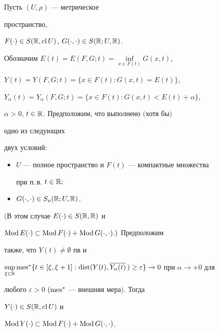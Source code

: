 \begin{thm} Пусть $(U,\rho)$ --- метрическое


пространство,


$F(\cdot)\in S(\Bbb R,\operatorname{cl} U)$, $G(\cdot,\cdot)\in S(\Bbb R;U,\Bbb R)$.


Обозначим $E(t)=E(F,G;t)=\inf\limits_{x\in F(t)}G(x,t)$,


$Y(t)=Y(F,G;t)=\{x\in F(t):G(x,t)=E(t)\}$,


$Y_\alpha(t)=Y_\alpha(F,G;t)=\{x\in F(t):G(x,t)<E(t)+\alpha\}$,


$\alpha>0$, $t\in\Bbb R$. Предположим, что выполнено $($хотя бы$)$


одно из следующих


двух условий$:$


\begin{itemize}


\item[1)] $U$ --- полное пространство и $F(t)$ --- компактные множества


при п.\,в. $t\in\Bbb R;$


\item[2)] $G(\cdot,\cdot)\in S_u(\Bbb R;U,\Bbb R)$.


\end{itemize}


$($В этом случае $E(\cdot)\in S(\Bbb R,\Bbb R)$ и


$\operatorname{Mod} E(\cdot)\subset\operatorname{Mod} F(\cdot)+\operatorname{Mod} G(\cdot,\cdot).)$ Предположим


также, что $Y(t)\ne\emptyset$ пв и


$\sup\limits_{\xi\in\Bbb R}\mes^*\{t\in[\xi,\xi+1]:\dist(Y(t),


\overline{Y_\alpha(t)}\,)\ge\varepsilon\}\to 0$ при $\alpha\to+0$ для


любого $\varepsilon>0$ $(\operatorname{mes}^*$ --- внешняя мера$).$ Тогда


$Y(\cdot)\in S(\Bbb R,\operatorname{cl} U)$ и


$\operatorname{Mod} Y(\cdot)\subset\operatorname{Mod} F(\cdot)+\operatorname{Mod} G(\cdot,\cdot)$.


\end{thm}





